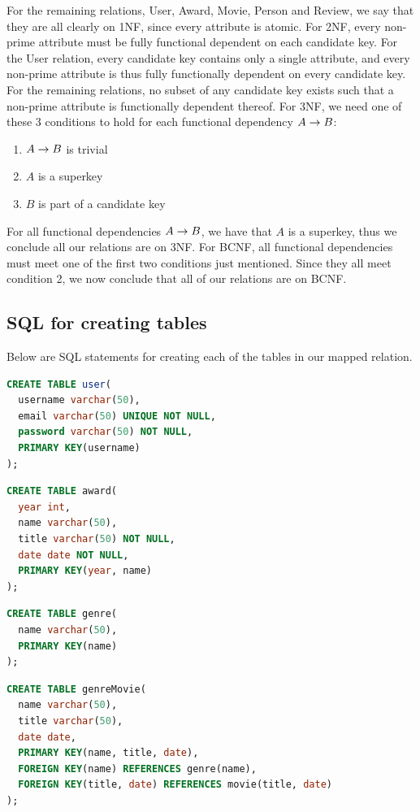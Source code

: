 For the remaining relations, User, Award, Movie, Person and Review, we say that they are all clearly on 1NF, since every attribute is atomic. For 2NF, every non-prime attribute must be fully functional dependent on each candidate key. For the User relation, every candidate key contains only a single attribute, and every non-prime attribute is thus fully functionally dependent on every candidate key. For the remaining relations, no subset of any candidate key exists such that a non-prime attribute is functionally dependent thereof. For 3NF, we need one of these 3 conditions to hold for each functional dependency $A \rightarrow  B$:
\begin{enumerate}
  \item $A \rightarrow B$ is trivial
  \item $A$ is a superkey
  \item $B$ is part of a candidate key
\end{enumerate}
For all functional dependencies $A \rightarrow B$, we have that $A$ is a superkey, thus we conclude all our relations are on 3NF. For BCNF, all functional dependencies must meet one of the first two conditions just mentioned. Since they all meet condition 2, we now conclude that all of our relations are on BCNF.

\subsection{SQL for creating tables}
Below are SQL statements for creating each of the tables in our mapped relation.
\begin{lstlisting}[language=SQL]
CREATE TABLE user(
  username varchar(50),
  email varchar(50) UNIQUE NOT NULL,
  password varchar(50) NOT NULL,
  PRIMARY KEY(username)
);
\end{lstlisting}

\begin{lstlisting}[language=SQL]
CREATE TABLE award(
  year int,
  name varchar(50),
  title varchar(50) NOT NULL,
  date date NOT NULL,
  PRIMARY KEY(year, name)
);
\end{lstlisting}

\begin{lstlisting}[language=SQL]
CREATE TABLE genre(
  name varchar(50),
  PRIMARY KEY(name)
);
\end{lstlisting}

\begin{lstlisting}[language=SQL]
CREATE TABLE genreMovie(
  name varchar(50),
  title varchar(50),
  date date,
  PRIMARY KEY(name, title, date),
  FOREIGN KEY(name) REFERENCES genre(name),
  FOREIGN KEY(title, date) REFERENCES movie(title, date)
);
\end{lstlisting}

